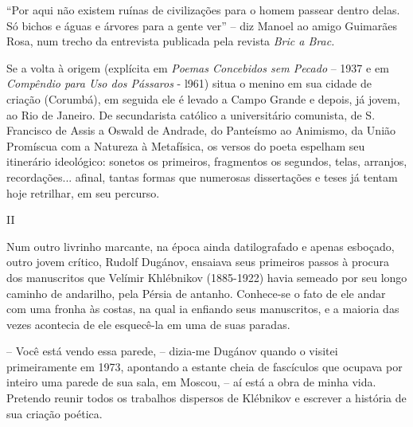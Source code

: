 ``Por aqui não existem ruínas de civilizações para o homem passear
dentro delas. Só bichos e águas e árvores para a gente ver'' -- diz
Manoel ao amigo Guimarães Rosa, num trecho da entrevista publicada pela
revista \emph{Bric a Brac.}

Se a volta à origem (explícita em \emph{Poemas Concebidos sem Pecado} --
1937 e em \emph{Compêndio para Uso dos Pássaros} - l961) situa o menino
em sua cidade de criação (Corumbá), em seguida ele é levado a Campo
Grande e depois, já jovem, ao Rio de Janeiro. De secundarista católico a
universitário comunista, de S. Francisco de Assis a Oswald de Andrade,
do Panteísmo ao Animismo, da União Promíscua com a Natureza à
Metafísica, os versos do poeta espelham seu itinerário ideológico:
sonetos os primeiros, fragmentos os segundos, telas, arranjos,
recordações... afinal, tantas formas que numerosas dissertações e teses
já tentam hoje retrilhar, em seu percurso.

II

Num outro livrinho marcante, na época ainda datilografado e apenas
esboçado, outro jovem crítico, Rudolf Dugánov, ensaiava seus primeiros
passos à procura dos manuscritos que Velímir Khlébnikov (1885-1922)
havia semeado por seu longo caminho de andarilho, pela Pérsia de
antanho. Conhece-se o fato de ele andar com uma fronha às costas, na
qual ia enfiando seus manuscritos, e a maioria das vezes acontecia de
ele esquecê-la em uma de suas paradas.

-- Você está vendo essa parede, -- dizia-me Dugánov quando o visitei
primeiramente em 1973, apontando a estante cheia de fascículos que
ocupava por inteiro uma parede de sua sala, em Moscou, -- aí está a obra
de minha vida. Pretendo reunir todos os trabalhos dispersos de Klébnikov
e escrever a história de sua criação poética.


